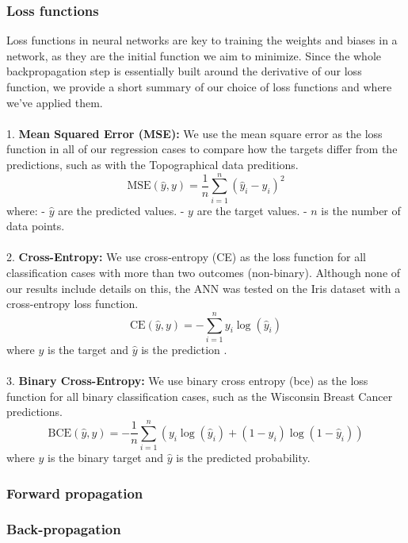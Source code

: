 \subsubsection{Loss functions}\label{sssec:loss_functions}
Loss functions in neural networks are key to training the weights and biases in a network, as they are the initial function we aim to minimize. 
Since the whole backpropagation step is essentially built around the derivative of our loss function, we provide a short summary of our choice of 
loss functions and where we've applied them. 
\\
\\
1. \textbf{Mean Squared Error (MSE):}
We use the mean square error as the loss function in all of our regression cases to compare how the targets differ from the predictions, such
as with the Topographical data preditions. 
   \[
   \text{MSE}(\hat{y}, y) = \frac{1}{n} \sum_{i=1}^{n} (\hat{y}_i - y_i)^2
   \]
   where:
   - \( \hat{y} \) are the predicted values.
   - \( y \) are the target values.
   - \( n \) is the number of data points.
\\
\\
2. \textbf{Cross-Entropy:}
We use cross-entropy (CE) as the loss function for all classification cases with more than two outcomes (non-binary). Although none of our results include
details on this, the ANN was tested on the Iris dataset with a cross-entropy loss function. 
   \[
   \text{CE}(\hat{y}, y) = -\sum_{i=1}^{n} y_i \log(\hat{y}_i)
   \]
   where \( y \) is the target and \( \hat{y} \) is the prediction .
\\
\\
3. \textbf{Binary Cross-Entropy:}
We use binary cross entropy (bce) as the loss function for all binary classification cases, such as the Wisconsin Breast Cancer predictions. 
   \[
   \text{BCE}(\hat{y}, y) = -\frac{1}{n} \sum_{i=1}^{n} \left( y_i \log(\hat{y}_i) + (1 - y_i) \log(1 - \hat{y}_i) \right)
   \]
%
where \( y \) is the binary target and \( \hat{y} \) is the predicted probability.
\\

\subsubsection{Forward propagation}\label{sssec:forward_propagation}

\subsubsection{Back-propagation}\label{sssec:backpropagation}

